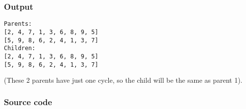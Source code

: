\documentclass{article}           %
\begin{document}
\subsubsection{Output}
\begin{verbatim}
Parents:
[2, 4, 7, 1, 3, 6, 8, 9, 5]
[5, 9, 8, 6, 2, 4, 1, 3, 7]
Children:
[2, 4, 7, 1, 3, 6, 8, 9, 5]
[5, 9, 8, 6, 2, 4, 1, 3, 7]
\end{verbatim}
(These 2 parents have just one cycle, so the child will be the same as parent 1).
\subsubsection{Source code}
\inputminted{Python}{cycle.py}


\end{document}
